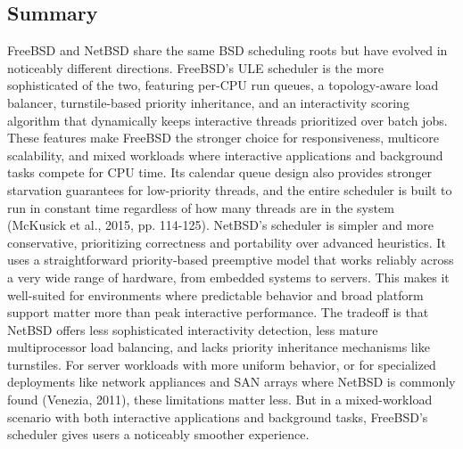 \subsection{Summary}
FreeBSD and NetBSD share the same BSD scheduling roots but have evolved in noticeably different directions. FreeBSD's ULE scheduler is the more sophisticated of the two, featuring per-CPU run queues, a topology-aware load balancer, turnstile-based priority inheritance, and an interactivity scoring algorithm that dynamically keeps interactive threads prioritized over batch jobs. These features make FreeBSD the stronger choice for responsiveness, multicore scalability, and mixed workloads where interactive applications and background tasks compete for CPU time. Its calendar queue design also provides stronger starvation guarantees for low-priority threads, and the entire scheduler is built to run in constant time regardless of how many threads are in the system (McKusick et al., 2015, pp. 114-125).
NetBSD's scheduler is simpler and more conservative, prioritizing correctness and portability over advanced heuristics. It uses a straightforward priority-based preemptive model that works reliably across a very wide range of hardware, from embedded systems to servers. This makes it well-suited for environments where predictable behavior and broad platform support matter more than peak interactive performance. The tradeoff is that NetBSD offers less sophisticated interactivity detection, less mature multiprocessor load balancing, and lacks priority inheritance mechanisms like turnstiles. For server workloads with more uniform behavior, or for specialized deployments like network appliances and SAN arrays where NetBSD is commonly found (Venezia, 2011), these limitations matter less. But in a mixed-workload scenario with both interactive applications and background tasks, FreeBSD's scheduler gives users a noticeably smoother experience.